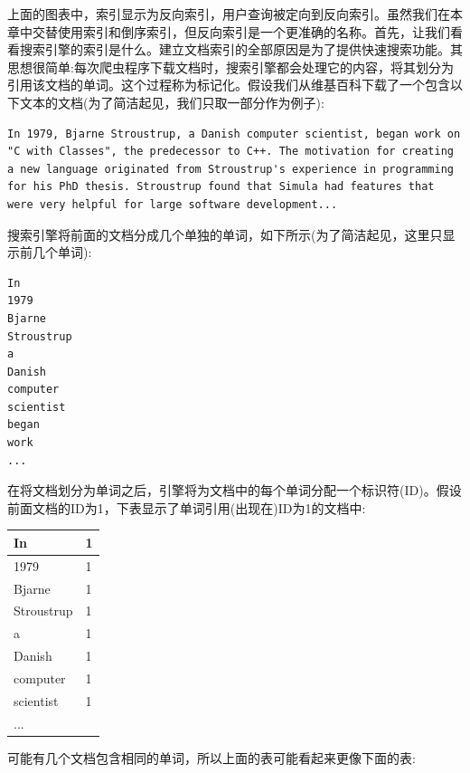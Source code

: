 上面的图表中，索引显示为反向索引，用户查询被定向到反向索引。虽然我们在本章中交替使用索引和倒序索引，但反向索引是一个更准确的名称。首先，让我们看看搜索引擎的索引是什么。建立文档索引的全部原因是为了提供快速搜索功能。其思想很简单:每次爬虫程序下载文档时，搜索引擎都会处理它的内容，将其划分为引用该文档的单词。这个过程称为标记化。假设我们从维基百科下载了一个包含以下文本的文档(为了简洁起见，我们只取一部分作为例子): \par

\begin{lstlisting}[caption={}]
In 1979, Bjarne Stroustrup, a Danish computer scientist, began work on "C with Classes", the predecessor to C++. The motivation for creating a new language originated from Stroustrup's experience in programming for his PhD thesis. Stroustrup found that Simula had features that were very helpful for large software development...
\end{lstlisting}

搜索引擎将前面的文档分成几个单独的单词，如下所示(为了简洁起见，这里只显示前几个单词): \par

\begin{lstlisting}[caption={}]
In
1979
Bjarne
Stroustrup
a
Danish
computer
scientist
began
work
...
\end{lstlisting}

在将文档划分为单词之后，引擎将为文档中的每个单词分配一个标识符(ID)。假设前面文档的ID为1，下表显示了单词引用(出现在)ID为1的文档中: \par

\begin{table}[h]
	\begin{tabularx}{\textwidth}{|X|X|}
	\hline
	In & 1 \\
	\hline
	1979 & 1 \\
	\hline
	Bjarne & 1 \\
	\hline
	Stroustrup & 1 \\
	\hline
	a & 1 \\
	\hline
	Danish & 1 \\
	\hline
	computer & 1 \\
	\hline
	scientist & 1 \\
	\hline
	... &  \\
	\hline
	\end{tabularx}
\end{table}

可能有几个文档包含相同的单词，所以上面的表可能看起来更像下面的表: \par

